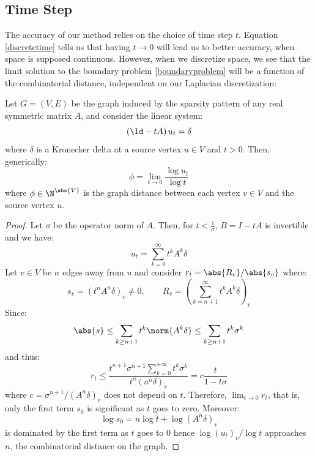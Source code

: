 \documentclass[math, info, english]{cours}
\begin{document}
\subsection{Time Step}\label{sectime}
The accuracy of our method relies on the choice of time step $t$.
Equation \ref{discretetime} tells us that having $t \to 0$ will lead us to better accuracy, when space is supposed continuous.
However, when we discretize space, we see that the limit solution to the boundary problem \ref{boundaryproblem} will be a function of the combinatorial distance, independent on our Laplacian discretization:
\begin{thm}
	Let $G = \left( V, E \right)$ be the graph induced by the sparsity pattern of any real symmetric matrix $A$, and consider the linear system:
	\begin{equation*}
		\left( \Id - t A \right)u_{t} = \delta
	\end{equation*}
	where $\delta$ is a Kronecker delta at a source vertex $u \in V$ and $t > 0$.
	Then, generically:
	\begin{equation*}
		\boxed{\phi = \lim_{t \to 0} \frac{\log u_{t}}{\log t}}
	\end{equation*}
	where $\phi \in \N^{\abs{V}}$ is the graph distance between each vertex $v \in V$ and the source vertex $u$.
	\label{thmcombi}
\end{thm}
\begin{proof}
	Let $\sigma$ be the operator norm of $A$.
	Then, for $t < \frac{1}{\sigma}$, $B = I - tA$ is invertible and we have:
	\begin{equation*}
		u_{t} = \sum_{k = 0}^{\infty} t^{k}A^{k}\delta
	\end{equation*}
	Let $v \in V$ be $n$ edges away from $u$ and consider $r_{t} = \abs{R_{v}}/\abs{s_{v}}$ where:
	\begin{equation*}
		s_{v} = \left( t^{n}A^{n}\delta \right)_{v} \neq 0, \qquad R_{v} = \left( \sum_{k = n + 1}^{\infty}t^{k}A^{k}\delta \right)_{v}
	\end{equation*}
	Since:
	\begin{equation*}
		\abs{s} \leq \sum_{k \geq n + 1} t^{k}\norm{A^{k}\delta} \leq \sum_{k \geq n + 1}t^{k}\sigma^{k}
	\end{equation*}
	and thus:
	\begin{equation*}
		r_{t} \leq \frac{t^{n + 1}\sigma^{n + 1}\sum_{k = 0}^{+\infty}t^{k}\sigma^{k}}{t^{n}\left( a^{n}\delta \right)_{v}} = c\frac{t}{1 - t\sigma}
	\end{equation*}
	where $c = \sigma^{n + 1}/\left( A^{n}\delta \right)_{v}$ does not depend on $t$.
	Therefore, $\lim_{t \to 0}r_{t}$, that is, only the first term $s_{0}$ is significant as $t$ goes to zero.
	Moreover:
	\begin{equation*}
		\log s_{0} = n\log t + \log \left( A^{n}\delta \right)_{v}
	\end{equation*}
	is dominated by the first term as $t$ goes to $0$ hence $\log \left( u_{t} \right)_{v} / \log t$ approaches $n$, the combinatorial distance on the graph.
\end{proof}
\end{document}
